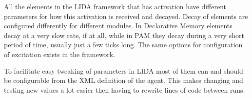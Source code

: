 All the elements in the LIDA framework that has activation have different parameters for how this activation is received and decayed. Decay of elements are configured differently for different modules. In Declarative Memory elements decay at a very slow rate, if at all, while in PAM they decay during a very short period of time, usually just a few ticks long. The same options for configuration of excitation exists in the framework. 

To facilitate easy tweaking of parameters in LIDA most of them can and should be configurable from the XML definition of the agent. This makes changing and testing new values a lot easier then having to rewrite lines of code between runs. 
